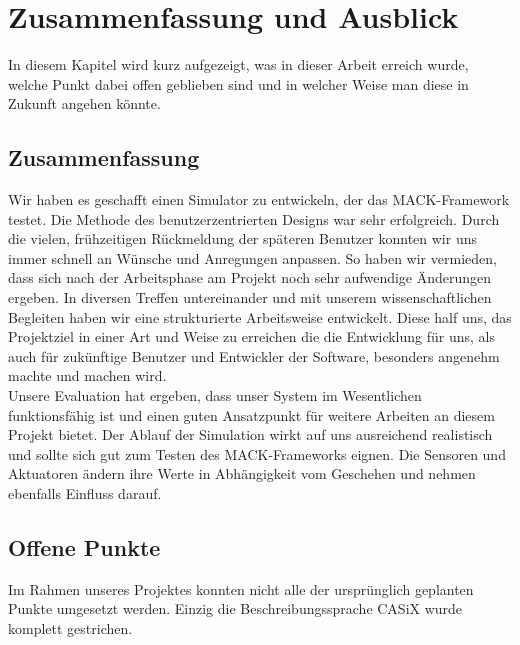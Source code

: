 \chapter{Zusammenfassung und Ausblick}\label{chapter:conclusions}
In diesem Kapitel wird kurz aufgezeigt, was in dieser Arbeit erreich wurde, welche Punkt dabei offen geblieben sind und in welcher Weise man diese in Zukunft angehen könnte.
\section{Zusammenfassung}\label{sec:conc_summary}
Wir haben es geschafft einen Simulator zu entwickeln, der das MACK-Framework testet. Die Methode des benutzerzentrierten Designs war sehr erfolgreich. Durch die vielen, frühzeitigen Rückmeldung der späteren Benutzer konnten wir uns immer schnell an Wünsche und Anregungen anpassen. So haben wir vermieden, dass sich nach der Arbeitsphase am Projekt noch sehr aufwendige Änderungen ergeben. 
In diversen Treffen untereinander und mit unserem wissenschaftlichen Begleiten haben wir eine strukturierte Arbeitsweise entwickelt. Diese half uns, das Projektziel in einer Art und Weise zu erreichen die die Entwicklung für uns, als auch für zukünftige Benutzer und Entwickler der Software, besonders angenehm machte und machen wird.\\

Unsere Evaluation hat ergeben, dass unser System im Wesentlichen funktionsfähig ist und einen guten Ansatzpunkt für weitere Arbeiten an diesem Projekt bietet. Der Ablauf der Simulation wirkt auf uns ausreichend realistisch und sollte sich gut zum Testen des MACK-Frameworks eignen. Die Sensoren und Aktuatoren ändern ihre Werte in Abhängigkeit vom Geschehen und nehmen ebenfalls Einfluss darauf.


\section{Offene Punkte}\label{sec:conc_open_questions}
Im Rahmen unseres Projektes konnten nicht alle der ursprünglich geplanten Punkte umgesetzt werden. Einzig die Beschreibungssprache CASiX wurde komplett gestrichen.

